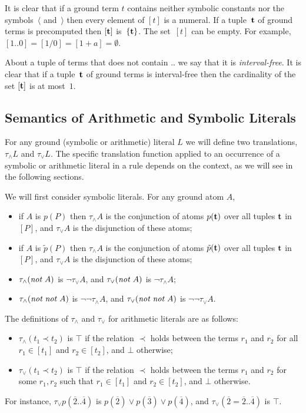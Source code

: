 \documentclass{tlp}
\def\no{{\it not}}
\begin{document}
It is clear that if a ground term $t$ contains neither symbolic 
constants nor the symbols~$\langle$ and~$\rangle$ then every element of $[t]$ 
is a numeral. 
If a tuple~${\bf t}$ of ground terms is  
precomputed then $[{\bf t}]$ is~$\{{\bf t}\}$. 
The set~$[t]$ can be empty. For example,
$[1..0] = [1/0] = [1+a] = \emptyset$.

About a tuple of terms that does not contain .. we say that it is 
{\sl interval-free}.
It is clear that if a tuple~${\bf t}$ of 
ground terms is interval-free then the cardinality of the set 
$[{\bf t}]$ is at most~$1$. 

\subsection{Semantics of Arithmetic and Symbolic Literals}

For any ground (symbolic or arithmetic) literal $L$ we will define 
two translations, 
$\tau_{\land}L$ and $\tau_{\lor}L$. The 
specific translation function applied to an occurrence of a symbolic or 
arithmetic literal in a rule
depends on the context, as we will see in the following sections. 

We will first consider symbolic literals. 
For any ground atom $A$,
\begin{itemize}
\item
if $A$ is $p(P)$ then $\tau_{\land}A$ is the conjunction of
atoms $p({\bf t})$ over all tuples $\bf t$ in~$[P]$,
and $\tau_{\lor}A$ is the disjunction of these atoms;
\item
if $A$ is $\tilde{p}(P)$ then $\tau_{\land}A$ is the conjunction of
atoms $\tilde{p}({\bf t})$ over all tuples $\bf t$ in~$[P]$,
and $\tau_{\lor}A$ is the disjunction of these atoms;
\item $\tau_{\land} (\no \; A)$ is $\neg \tau_{\lor} A$, and
 $\tau_{\lor} (\no \; A)$ is $\neg \tau_{\land} A$; 
\item $\tau_{\land} (\no \; \no \; A)$ is 
$\neg\neg \tau_{\land} A$, and  
$\tau_{\lor} (\no \; \no \; A)$ is 
$\neg\neg \tau_{\lor} A$. 
\end{itemize}
The definitions of  $\tau_{\land}$ and $\tau_{\lor}$ for arithmetic literals
 are as follows: 
\begin{itemize}
\item $\tau_{\land} (t_1 \prec t_2)$ is 
$\top$ if the relation $\prec$ holds between 
the terms $r_1$ and $r_2$ for all $r_1 \in 
[t_1]$ and $r_2 \in [t_2]$, and $\bot$  
otherwise; 
\item $\tau_{\lor} (t_1 \prec t_2)$ is
$\top$ if the relation $\prec$ holds between the terms 
$r_1$ and $r_2$ for some $r_1, r_2$
such that $r_1 \in [t_1]$ and $r_2 \in [t_2]$, and $\bot$ otherwise. 
\end{itemize}
For instance, $\tau_{\lor}p(\overline 2..\overline 4)$ is
$p(\overline 2) \lor p(\overline 3) \lor p(\overline 4)$,
and $\tau_{\lor}(\overline 2=\overline 2..\overline 4)$ is $\top$.
 
\end{document}
